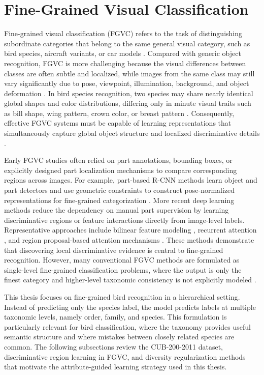 \section{Fine-Grained Visual Classification}

Fine-grained visual classification (FGVC) refers to the task of distinguishing subordinate categories that belong to the same general visual category, such as bird species, aircraft variants, or car models \cite{Fine-grainedSurvey}. Compared with generic object recognition, FGVC is more challenging because the visual differences between classes are often subtle and localized, while images from the same class may still vary significantly due to pose, viewpoint, illumination, background, and object deformation \cite{Fine-grainedSurvey, Zhou_2016_CVPR, TransIFC}. In bird species recognition, two species may share nearly identical global shapes and color distributions, differing only in minute visual traits such as bill shape, wing pattern, crown color, or breast pattern \cite{wah2011cub,HierarchicalFeatureAtt, He_2017}. Consequently, effective FGVC systems must be capable of learning representations that simultaneously capture global object structure and localized discriminative details \cite{HierarchicalFeatureAtt}.

Early FGVC studies often relied on part annotations, bounding boxes, or explicitly designed part localization mechanisms to compare corresponding regions across images. For example, part-based R-CNN methods learn object and part detectors and use geometric constraints to construct pose-normalized representations for fine-grained categorization \cite{zhang2014part}. More recent deep learning methods reduce the dependency on manual part supervision by learning discriminative regions or feature interactions directly from image-level labels. Representative approaches include bilinear feature modeling \cite{lin2015bilinear}, recurrent attention \cite{fu2017racnn}, and region proposal-based attention mechanisms \cite{yang2018learning}. These methods demonstrate that discovering local discriminative evidence is central to fine-grained recognition. However, many conventional FGVC methods are formulated as single-level fine-grained classification problems, where the output is only the finest category and higher-level taxonomic consistency is not explicitly modeled \cite{Fine-grainedSurvey, park2025visually}.

This thesis focuses on fine-grained bird recognition in a hierarchical setting. Instead of predicting only the species label, the model predicts labels at multiple taxonomic levels, namely order, family, and species. This formulation is particularly relevant for bird classification, where the taxonomy provides useful semantic structure and where mistakes between closely related species are common. The following subsections review the CUB-200-2011 dataset, discriminative region learning in FGVC, and diversity regularization methods that motivate the attribute-guided learning strategy used in this thesis.


